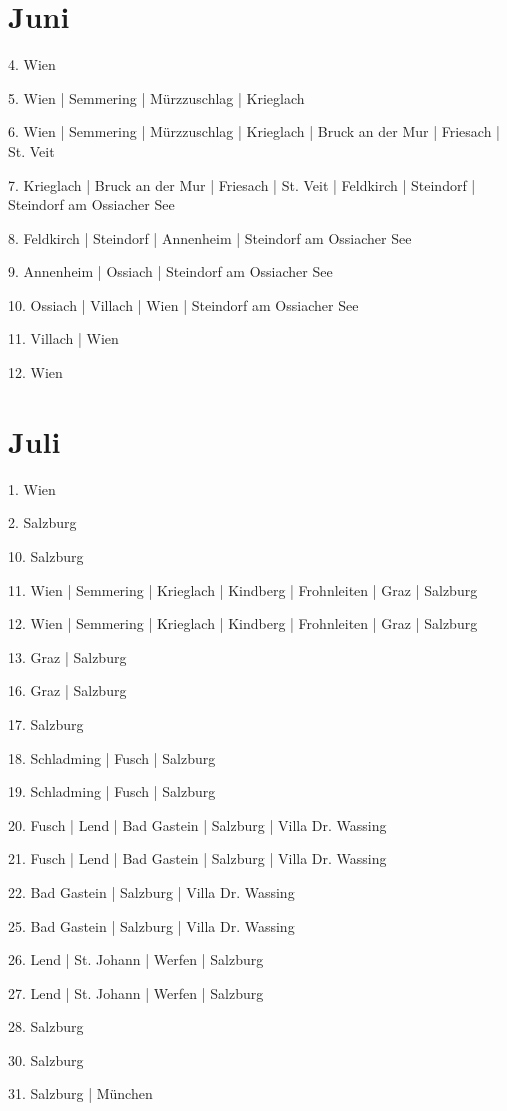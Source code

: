 \documentclass[twoside=false,titlepage=false,open=any, parskip=never, fontsize=10pt, headings=small, chapterprefix=false, appendixprefix=false, DIV=15]{scrbook}
\begin{document}
\begin{multicols}{3}
            \section*{Juni}
            4. Wien\par
            5. Wien | Semmering | Mürzzuschlag | Krieglach\par
            6. Wien | Semmering | Mürzzuschlag | Krieglach | Bruck an der Mur | Friesach | St. Veit\par
            7. Krieglach | Bruck an der Mur | Friesach | St. Veit | Feldkirch | Steindorf | Steindorf am Ossiacher See\par
            8. Feldkirch | Steindorf | Annenheim | Steindorf am Ossiacher See\par
            9. Annenheim | Ossiach | Steindorf am Ossiacher See\par
            10. Ossiach | Villach | Wien | Steindorf am Ossiacher See\par
            11. Villach | Wien\par
            12. Wien\par
            \section*{Juli}
            1. Wien\par
            2. Salzburg\par
            10. Salzburg\par
            11. Wien | Semmering | Krieglach | Kindberg | Frohnleiten | Graz | Salzburg\par
            12. Wien | Semmering | Krieglach | Kindberg | Frohnleiten | Graz | Salzburg\par
            13. Graz | Salzburg\par
            16. Graz | Salzburg\par
            17. Salzburg\par
            18. Schladming | Fusch | Salzburg\par
            19. Schladming | Fusch | Salzburg\par
            20. Fusch | Lend | Bad Gastein | Salzburg | Villa Dr. Wassing\par
            21. Fusch | Lend | Bad Gastein | Salzburg | Villa Dr. Wassing\par
            22. Bad Gastein | Salzburg | Villa Dr. Wassing\par
            25. Bad Gastein | Salzburg | Villa Dr. Wassing\par
            26. Lend | St. Johann | Werfen | Salzburg\par
            27. Lend | St. Johann | Werfen | Salzburg\par
            28. Salzburg\par
            30. Salzburg\par
            31. Salzburg | München\par

\end{multicols}
\end{document}

